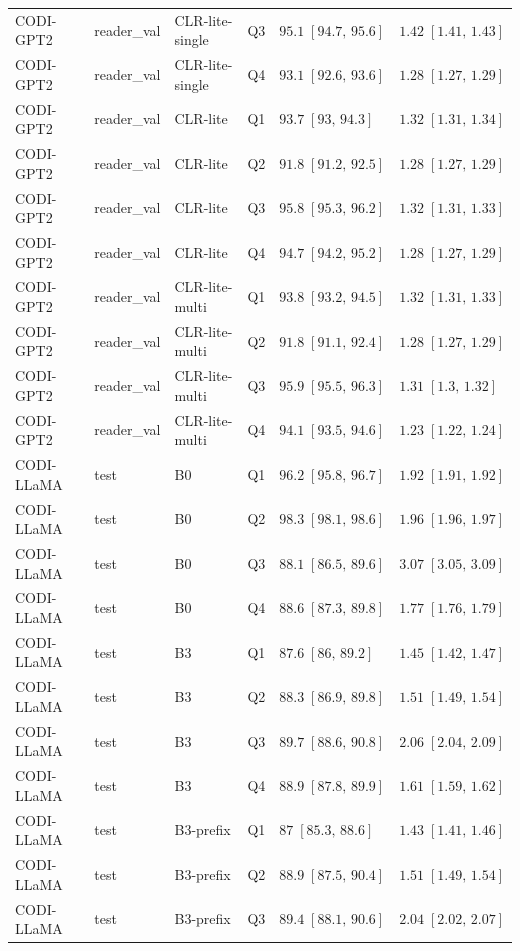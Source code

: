 \begin{longtable}{@{}p{}p{}p{}p{}p{}p{}@{}}
CODI-GPT2 & reader\_val & CLR-lite-single & Q3 & $95.1\;[94.7,\,95.6]$ & $1.42\;[1.41,\,1.43]$ \\
CODI-GPT2 & reader\_val & CLR-lite-single & Q4 & $93.1\;[92.6,\,93.6]$ & $1.28\;[1.27,\,1.29]$ \\
CODI-GPT2 & reader\_val & CLR-lite & Q1 & $93.7\;[93,\,94.3]$ & $1.32\;[1.31,\,1.34]$ \\
CODI-GPT2 & reader\_val & CLR-lite & Q2 & $91.8\;[91.2,\,92.5]$ & $1.28\;[1.27,\,1.29]$ \\
CODI-GPT2 & reader\_val & CLR-lite & Q3 & $95.8\;[95.3,\,96.2]$ & $1.32\;[1.31,\,1.33]$ \\
CODI-GPT2 & reader\_val & CLR-lite & Q4 & $94.7\;[94.2,\,95.2]$ & $1.28\;[1.27,\,1.29]$ \\
CODI-GPT2 & reader\_val & CLR-lite-multi & Q1 & $93.8\;[93.2,\,94.5]$ & $1.32\;[1.31,\,1.33]$ \\
CODI-GPT2 & reader\_val & CLR-lite-multi & Q2 & $91.8\;[91.1,\,92.4]$ & $1.28\;[1.27,\,1.29]$ \\
CODI-GPT2 & reader\_val & CLR-lite-multi & Q3 & $95.9\;[95.5,\,96.3]$ & $1.31\;[1.3,\,1.32]$ \\
CODI-GPT2 & reader\_val & CLR-lite-multi & Q4 & $94.1\;[93.5,\,94.6]$ & $1.23\;[1.22,\,1.24]$ \\
CODI-LLaMA & test & B0 & Q1 & $96.2\;[95.8,\,96.7]$ & $1.92\;[1.91,\,1.92]$ \\
CODI-LLaMA & test & B0 & Q2 & $98.3\;[98.1,\,98.6]$ & $1.96\;[1.96,\,1.97]$ \\
CODI-LLaMA & test & B0 & Q3 & $88.1\;[86.5,\,89.6]$ & $3.07\;[3.05,\,3.09]$ \\
CODI-LLaMA & test & B0 & Q4 & $88.6\;[87.3,\,89.8]$ & $1.77\;[1.76,\,1.79]$ \\
CODI-LLaMA & test & B3 & Q1 & $87.6\;[86,\,89.2]$ & $1.45\;[1.42,\,1.47]$ \\
CODI-LLaMA & test & B3 & Q2 & $88.3\;[86.9,\,89.8]$ & $1.51\;[1.49,\,1.54]$ \\
CODI-LLaMA & test & B3 & Q3 & $89.7\;[88.6,\,90.8]$ & $2.06\;[2.04,\,2.09]$ \\
CODI-LLaMA & test & B3 & Q4 & $88.9\;[87.8,\,89.9]$ & $1.61\;[1.59,\,1.62]$ \\
CODI-LLaMA & test & B3-prefix & Q1 & $87\;[85.3,\,88.6]$ & $1.43\;[1.41,\,1.46]$ \\
CODI-LLaMA & test & B3-prefix & Q2 & $88.9\;[87.5,\,90.4]$ & $1.51\;[1.49,\,1.54]$ \\
CODI-LLaMA & test & B3-prefix & Q3 & $89.4\;[88.1,\,90.6]$ & $2.04\;[2.02,\,2.07]$ \\

\end{longtable}
